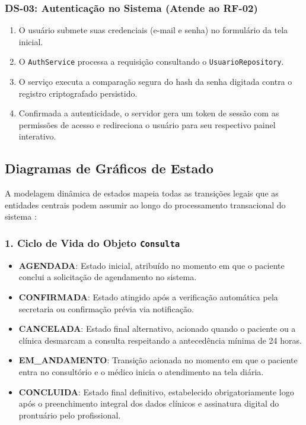 \subsubsection{DS-03: Autenticação no Sistema (Atende ao RF-02)}
\begin{enumerate}
    \item O usuário submete suas credenciais (e-mail e senha) no formulário da tela inicial.
    \item O \texttt{AuthService} processa a requisição consultando o \texttt{UsuarioRepository}.
    \item O serviço executa a comparação segura do hash da senha digitada contra o registro criptografado persistido.
    \item Confirmada a autenticidade, o servidor gera um token de sessão com as permissões de acesso e redireciona o usuário para seu respectivo painel interativo.
\end{enumerate}

\subsection{Diagramas de Gráficos de Estado}

A modelagem dinâmica de estados mapeia todas as transições legais que as entidades centrais podem assumir ao longo do processamento transacional do sistema \cite{booch2005}:

\subsubsection{1. Ciclo de Vida do Objeto \texttt{Consulta}}
\begin{itemize}
    \item \textbf{AGENDADA}: Estado inicial, atribuído no momento em que o paciente conclui a solicitação de agendamento no sistema.
    \item \textbf{CONFIRMADA}: Estado atingido após a verificação automática pela secretaria ou confirmação prévia via notificação.
    \item \textbf{CANCELADA}: Estado final alternativo, acionado quando o paciente ou a clínica desmarcam a consulta respeitando a antecedência mínima de 24 horas.
    \item \textbf{EM\_ANDAMENTO}: Transição acionada no momento em que o paciente entra no consultório e o médico inicia o atendimento na tela diária.
    \item \textbf{CONCLUIDA}: Estado final definitivo, estabelecido obrigatoriamente logo após o preenchimento integral dos dados clínicos e assinatura digital do prontuário pelo profissional.
\end{itemize}

